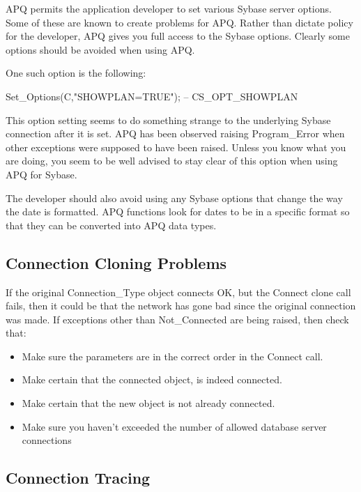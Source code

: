 \documentclass[english,letterpaper]{book}
\begin{document}
APQ permits the application developer to set various Sybase server
options. Some of these are known to create problems for APQ. Rather
than dictate policy for the developer, APQ gives you full access to
the Sybase options. Clearly some options should be avoided when using
APQ.

One such option is the following:

\begin{Example}

   Set_Options(C,"SHOWPLAN=TRUE"); -- CS_OPT_SHOWPLAN

\end{Example}

This option setting seems to do something strange to the underlying
Sybase connection after it is set. APQ has been observed raising Program\_Error
when other exceptions were supposed to have been raised. Unless you
know what you are doing, you seem to be well advised to stay clear
of this option when using APQ for Sybase.

The developer should also avoid using any Sybase options that change
the way the date is formatted. APQ functions look for dates to be
in a specific format so that they can be converted into APQ data types.


\subsection{Connection Cloning Problems}

If the original Connection\_Type object connects OK, but the Connect
clone call fails, then it could be that the network has gone bad since
the original connection was made. If exceptions other than Not\_Connected
are being raised, then check that:

\begin{itemize}
   \item Make sure the parameters are in the correct order in the Connect call.
   \item Make certain that the connected object, is indeed connected.
   \item Make certain that the new object is not already connected.
   \item Make sure you haven't exceeded the number of allowed database server
         connections
\end{itemize}

\subsection{Connection Tracing}
\end{document}
